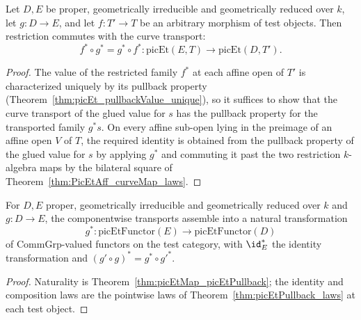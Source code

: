 \begin{theorem}
  \label{thm:picEtMap_picEtPullback}
  \leanok
  Let \(D, E\) be proper, geometrically irreducible and geometrically reduced over
  \(k\), let \(g \colon D \to E\), and let \(f \colon T' \to T\) be an arbitrary
  morphism of test objects. Then restriction commutes with the curve transport:
  \[
    f^{*} \circ g^{*} = g^{*} \circ f^{*}
    \colon \mathrm{picEt}(E, T) \longrightarrow \mathrm{picEt}(D, T').
  \]
\end{theorem}
\begin{proof}
  \leanok
  The value of the restricted family \(f^{*}\) at each affine open of \(T'\) is
  characterized uniquely by its pullback property
  (Theorem~\ref{thm:picEt_pullbackValue_unique}), so it suffices to show that the curve
  transport of the glued value for \(s\) has the pullback property for the transported
  family \(g^{*}s\). On every affine sub-open lying in the preimage of an affine open
  \(V\) of \(T\), the required identity is obtained from the pullback property of the
  glued value for \(s\) by applying \(g^{*}\) and commuting it past the two restriction
  \(k\)-algebra maps by the bilateral square of
  Theorem~\ref{thm:PicEtAff_curveMap_laws}.
\end{proof}

\begin{definition}
  \label{def:picEtPullbackNat}
  \leanok
  For \(D, E\) proper, geometrically irreducible and geometrically reduced over \(k\)
  and \(g \colon D \to E\), the componentwise transports assemble into a natural
  transformation
  \[
    g^{*} \colon \mathrm{picEtFunctor}(E) \longrightarrow \mathrm{picEtFunctor}(D)
  \]
  of \(\mathrm{CommGrp}\)-valued functors on the test category, with
  \(\id_E^{*}\) the identity transformation and
  \((g' \circ g)^{*} = g^{*} \circ g'^{*}\).
\end{definition}
\begin{proof}
  \leanok
  Naturality is Theorem~\ref{thm:picEtMap_picEtPullback}; the identity and composition
  laws are the pointwise laws of Theorem~\ref{thm:picEtPullback_laws} at each test
  object.
\end{proof}

